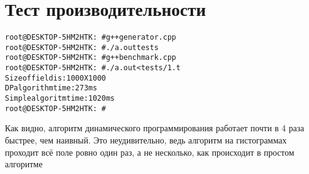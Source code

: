 \section{Тест производительности}

\begin{alltt}
root@DESKTOP-5HM2HTK:~# g++ generator.cpp
root@DESKTOP-5HM2HTK:~# ./a.out tests
root@DESKTOP-5HM2HTK:~# g++ benchmark.cpp
root@DESKTOP-5HM2HTK:~# ./a.out <tests/1.t
Size of field is: 1000 X 1000
DP algorithm time: 273ms
Simple algoritm time: 1020ms
root@DESKTOP-5HM2HTK:~#
\end{alltt}

Как видно, алгоритм динамического программирования работает почти в 4 раза быстрее, чем наивный. Это неудивительно, ведь алгоритм на гистограммах проходит всё поле ровно один раз, а не несколько, как происходит в простом алгоритме

\pagebreak

